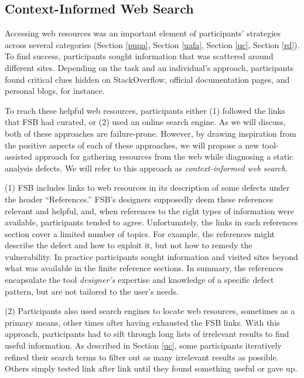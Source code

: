 \documentclass[10pt,journal,compsoc]{IEEEtran}
\begin{document}
\subsection{Context-Informed Web Search}
Accessing web resources was an important element of participants' strategies across several categories (Section \ref{pupa}, Section \ref{uafa}, Section \ref{uc}, Section \ref{rd}).
To find success, participants sought information that was scattered around different sites.
Depending on the task and an individual's approach, participants found critical clues hidden on StackOverflow, official documentation pages, and personal blogs, for instance. 

To reach these helpful web resources, participants either (1) followed the links that FSB had curated, or (2) used an online search engine. As we will discuss, both of these approaches are failure-prone.
However, by drawing inspiration from the positive aspects of each of these approaches, we will propose a new tool-assisted approach for gathering resources from the web while diagnosing a static analysis defects. 
We will refer to this approach as \textit{context-informed web search}.

(1)
FSB includes links to web resources in its description of some defects under the header ``References.''
FSB's designers supposedly deem these references relevant and helpful, and, when references to the right types of information were available, participants tended to agree.
Unfortunately, the links in each references section cover a limited number of topics.
For example, the references might describe the defect and how to exploit it, but not how to remedy the vulnerability.
In practice participants sought information and visited sites beyond what was available in the finite reference sections.
In summary, the references encapsulate the tool \textit{designer's} expertise and knowledge of a specific defect pattern, but are not tailored to the user's needs.


(2)
Participants also used search engines to locate web resources, sometimes as a primary means, other times after having exhausted the FSB links.
With this approach, participants had to sift through long lists of irrelevant results to find useful information.
As described in Section \ref{uc}, some participants iteratively refined their search terms to filter out as many irrelevant results as possible.
Others simply tested link after link until they found something useful or gave up.
\end{document}
